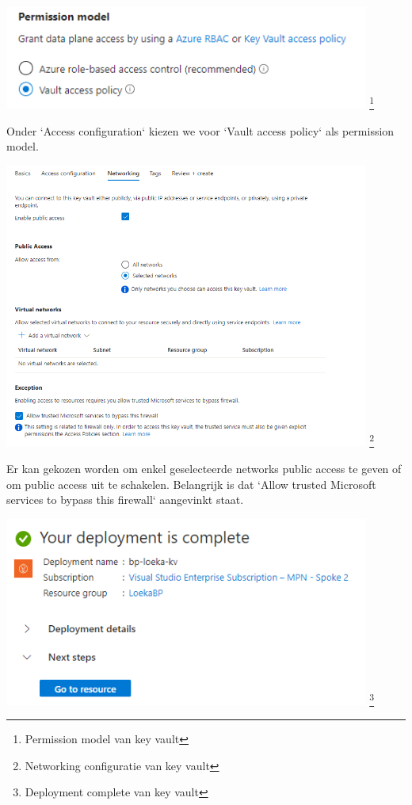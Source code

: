 \begin{center}
    \includegraphics[width=0.9\textwidth]{./graphics/databricks/connection_9.png}
    \footnote{Permission model van key vault}
\end{center}

Onder `Access configuration` kiezen we voor `Vault access policy` als permission model.

\begin{center}
    \includegraphics[width=0.9\textwidth]{./graphics/databricks/connection_10.png}
    \footnote{Networking configuratie van key vault}
\end{center}

Er kan gekozen worden om enkel geselecteerde networks public access te geven of om public access uit te schakelen. Belangrijk is dat `Allow trusted Microsoft services to bypass this firewall` aangevinkt staat.

\begin{center}
    \includegraphics[width=0.9\textwidth]{./graphics/databricks/connection_11.png}
    \footnote{Deployment complete van key vault}
\end{center}

